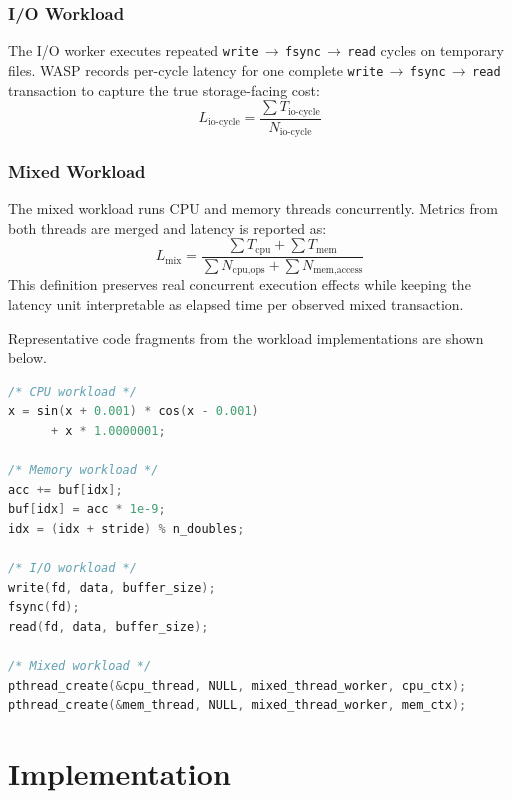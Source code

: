\documentclass[conference]{IEEEtran}
\begin{document}
\subsubsection{I/O Workload}
The I/O worker executes repeated
\texttt{write}\,$\rightarrow$\,\texttt{fsync}\,$\rightarrow$\,\texttt{read}
cycles on temporary files.  WASP records per-cycle latency for one complete
\texttt{write}\,$\rightarrow$\,\texttt{fsync}\,$\rightarrow$\,\texttt{read}
transaction to capture the true storage-facing cost:
\begin{equation}
L_{\text{io-cycle}} = \frac{\sum T_{\text{io-cycle}}}{N_{\text{io-cycle}}}
\end{equation}

\subsubsection{Mixed Workload}
The mixed workload runs CPU and memory threads concurrently.  Metrics from both
threads are merged and latency is reported as:
\begin{equation}
L_{\text{mix}} = \frac{\sum T_{\text{cpu}} + \sum T_{\text{mem}}}{\sum N_{\text{cpu,ops}} + \sum N_{\text{mem,access}}}
\end{equation}
This definition preserves real concurrent execution effects while keeping the
latency unit interpretable as elapsed time per observed mixed transaction.

Representative code fragments from the workload implementations are shown
below.
\begin{lstlisting}[language=C,basicstyle=\ttfamily\scriptsize,columns=fullflexible,breaklines=true,breakatwhitespace=false,postbreak=\mbox{\textcolor{gray}{$\hookrightarrow$}\space}]
/* CPU workload */
x = sin(x + 0.001) * cos(x - 0.001)
      + x * 1.0000001;

/* Memory workload */
acc += buf[idx];
buf[idx] = acc * 1e-9;
idx = (idx + stride) % n_doubles;

/* I/O workload */
write(fd, data, buffer_size);
fsync(fd);
read(fd, data, buffer_size);

/* Mixed workload */
pthread_create(&cpu_thread, NULL, mixed_thread_worker, cpu_ctx);
pthread_create(&mem_thread, NULL, mixed_thread_worker, mem_ctx);
\end{lstlisting}

\section{Implementation}
\label{sec:implementation}
\end{document}
